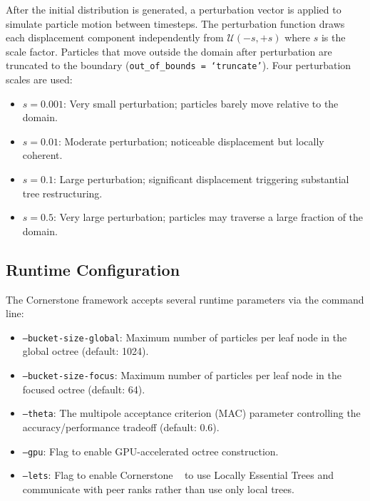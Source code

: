After the initial distribution is generated, a perturbation vector is applied to simulate particle motion between timesteps. The perturbation function draws each displacement component independently from $\mathcal{U}(-s, +s)$ where $s$ is the scale factor. Particles that move outside the domain after perturbation are truncated to the boundary (\texttt{out\_of\_bounds = `truncate'}). Four perturbation scales are used:

\begin{itemize}
    \item $s = 0.001$: Very small perturbation; particles barely move relative to the domain.
    \item $s = 0.01$\phantom{0}: Moderate perturbation; noticeable displacement but locally coherent.
    \item $s = 0.1$\phantom{00}: Large perturbation; significant displacement triggering substantial tree restructuring.
    \item $s = 0.5$\phantom{00}: Very large perturbation; particles may traverse a large fraction of the domain.
\end{itemize}

\subsection{Runtime Configuration}

The Cornerstone framework accepts several runtime parameters via the command line:

\begin{itemize}
    \item \texttt{--bucket-size-global}: Maximum number of particles per leaf node in the global octree (default: 1024).
    \item \texttt{--bucket-size-focus}: Maximum number of particles per leaf node in the focused octree (default: 64).
    \item \texttt{--theta}: The multipole acceptance criterion (MAC) parameter controlling the accuracy/performance tradeoff (default: 0.6).
    \item \texttt{--gpu}: Flag to enable GPU-accelerated octree construction.
    \item \texttt{--lets}: Flag to enable Cornerstone ~\cite{cornerstone} to use Locally Essential Trees and communicate with peer ranks rather than use only local trees.
\end{itemize}



